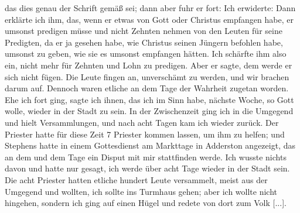das dies genau der Schrift gemäß sei; dann aber 
fuhr er fort:  Ich
erwiderte:  Dann erklärte ich ihm, das, wenn
er etwas von Gott oder Christus empfangen habe, er umsonst
predigen müsse und nicht Zehnten nehmen von den Leuten für
seine Predigten, da er ja gesehen habe, wie Christus seinen
Jüngern befohlen habe, umsonst zu geben, wie sie es umsonst
empfangen hätten. Ich schärfte ihm also ein, nicht mehr für
Zehnten und Lohn zu predigen. Aber er sagte, dem werde er
sich nicht fügen. Die Leute fingen an, unverschämt zu werden,
und wir brachen darum auf. Dennoch waren etliche an dem
Tage der Wahrheit zugetan worden. Ehe ich fort ging, sagte
ich ihnen, das ich im Sinn habe, nächste Woche, so Gott wolle,
wieder in der Stadt zu sein. In der Zwischenzeit ging ich in
die Umgegend und hielt Versammlungen, und nach acht Tagen
kam ich wieder zurück. Der Priester hatte für diese Zeit 7 Priester
kommen lassen, um ihm zu helfen; und Stephens hatte in einem
Gottesdienst am Markttage in Adderston angezeigt, das an dem
und dem Tage ein Disput mit mir stattfinden werde. Ich wusste
nichts davon und hatte nur gesagt, ich werde über acht Tage
wieder in der Stadt sein. Die acht Priester hatten etliche hundert
Leute versammelt, meist aus der Umgegend und wollten, ich sollte
ins Turmhaus gehen; aber ich wollte nicht hingehen, sondern
ich ging auf einen Hügel und redete von dort zum Volk [...].


